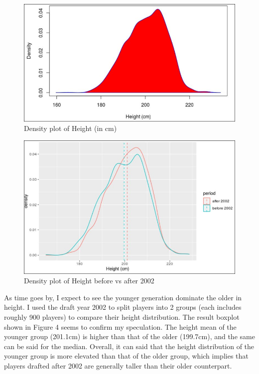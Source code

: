 \documentclass[a4paper,12pt,twoside]{article}
\numberwithin{equation}{section}
\begin{document}
\begin{figure}[h!]
\caption{Density plot of Height (in cm)}
\includegraphics[scale=0.3]{dsoh.jpg}
\centering
\end{figure}

\begin{figure}[h]
\caption{Density plot of Height before vs after 2002}
\includegraphics[scale=0.32]{hebf02.jpg}
\centering
\end{figure}

As time goes by, I expect to see the younger generation dominate the older in height. I used the draft year 2002 to split players into 2 groups (each includes roughly 900 players) to compare their height distribution. The result boxplot shown in Figure 4 seems to confirm my speculation. The height mean of the younger group (201.1cm) is higher than that of the older (199.7cm), and the same can be said for the median. Overall, it can said that the height distribution of the younger group is more elevated than that of the older group, which implies that players drafted after 2002 are generally taller than their older counterpart.
\end{document}
